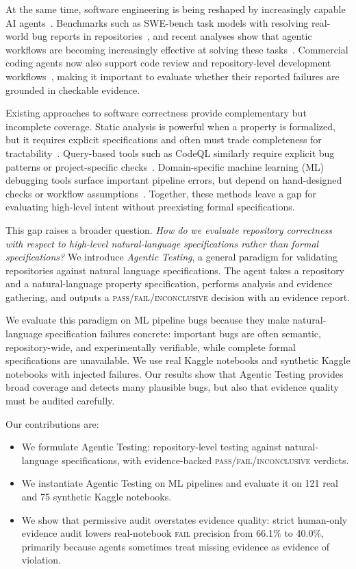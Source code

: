 \documentclass[11pt]{article}
\begin{document}
At the same time, software engineering is being reshaped by increasingly capable AI agents~\citep{metr2025longtasks}.
Benchmarks such as SWE-bench task models with resolving real-world bug reports in repositories~\citep{jimenez2024swebench,swebench-verified}, and recent analyses show that agentic workflows are becoming increasingly effective at solving these tasks~\citep{xia2024agentless,guo2025repoaudit}.
Commercial coding agents now also support code review and repository-level development workflows~\citep{openai_codex}, making it important to evaluate whether their reported failures are grounded in checkable evidence.

Existing approaches to software correctness provide complementary but incomplete coverage.
Static analysis is powerful when a property is formalized, but it requires explicit specifications and often must trade completeness for tractability~\citep{cousot1979systematic,nielson1999principles}.
Query-based tools such as CodeQL similarly require explicit bug patterns or project-specific checks~\citep{codeql}.
Domain-specific machine learning (ML) debugging tools surface important pipeline errors, but depend on hand-designed checks or workflow assumptions~\citep{schoop2021umlaut,traincheck}.
Together, these methods leave a gap for evaluating high-level intent without preexisting formal specifications.

This gap raises a broader question.
\textit{How do we evaluate repository correctness with respect to high-level natural-language specifications rather than formal specifications?}
We introduce \emph{Agentic Testing}, a general paradigm for validating repositories against natural language specifications.
The agent takes a repository and a natural-language property specification, performs analysis and evidence gathering, and outputs a \textsc{pass}/\textsc{fail}/\textsc{inconclusive} decision with an evidence report.

We evaluate this paradigm on ML pipeline bugs because they make natural-language specification failures concrete: important bugs are often semantic, repository-wide, and experimentally verifiable, while complete formal specifications are unavailable.
We use real Kaggle notebooks and synthetic Kaggle notebooks with injected failures.
Our results show that Agentic Testing provides broad coverage and detects many plausible bugs, but also that evidence quality must be audited carefully.

Our contributions are:
\begin{itemize}
  \item We formulate Agentic Testing: repository-level testing against natural-language specifications, with evidence-backed \textsc{pass}/\textsc{fail}/\textsc{inconclusive} verdicts.
  \item We instantiate Agentic Testing on ML pipelines and evaluate it on 121 real and 75 synthetic Kaggle notebooks.
  \item We show that permissive audit overstates evidence quality: strict human-only evidence audit lowers real-notebook \textsc{fail} precision from 66.1\% to 40.0\%, primarily because agents sometimes treat missing evidence as evidence of violation.
\end{itemize}
\end{document}
